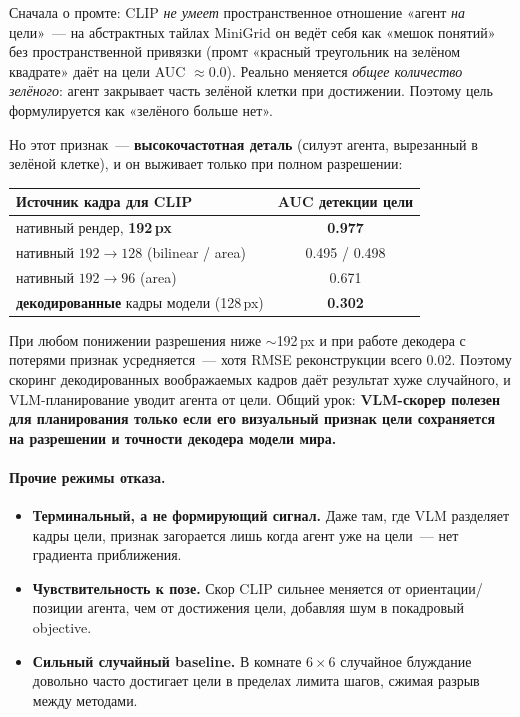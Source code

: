 \documentclass[11pt]{article}
\begin{document}
Сначала о промте: CLIP \emph{не умеет} пространственное отношение «агент \emph{на} цели»~---
на абстрактных тайлах MiniGrid он ведёт себя как «мешок понятий» без пространственной
привязки (промт «красный треугольник на зелёном квадрате» даёт на цели AUC $\approx 0.0$).
Реально меняется \emph{общее количество зелёного}: агент закрывает часть зелёной клетки при
достижении. Поэтому цель формулируется как «зелёного больше нет».

Но этот признак~--- \textbf{высокочастотная деталь} (силуэт агента, вырезанный в зелёной
клетке), и он выживает только при полном разрешении:

\begin{center}
\small
\begin{tabular}{@{}>{\raggedright\arraybackslash}p{9.5cm}c@{}}
\toprule
Источник кадра для CLIP & AUC детекции цели \\
\midrule
нативный рендер, \textbf{192\,px} & \textbf{0.977} \\
нативный $192 \to 128$ (bilinear / area) & 0.495 / 0.498 \\
нативный $192 \to 96$ (area) & 0.671 \\
\textbf{декодированные} кадры модели (128\,px) & \textbf{0.302} \\
\bottomrule
\end{tabular}
\end{center}

\noindent При любом понижении разрешения ниже $\sim$192\,px и при работе декодера с
потерями признак усредняется~--- хотя RMSE реконструкции всего 0.02. Поэтому скоринг
декодированных воображаемых кадров даёт результат хуже случайного, и VLM-планирование
уводит агента от цели. Общий урок: \textbf{VLM-скорер полезен для планирования только если
его визуальный признак цели сохраняется на разрешении и точности декодера модели мира.}

\paragraph{Прочие режимы отказа.}
\begin{itemize}
  \item \textbf{Терминальный, а не формирующий сигнал.} Даже там, где VLM разделяет кадры
  цели, признак загорается лишь когда агент уже на цели~--- нет градиента приближения.
  \item \textbf{Чувствительность к позе.} Скор CLIP сильнее меняется от ориентации/позиции
  агента, чем от достижения цели, добавляя шум в покадровый objective.
  \item \textbf{Сильный случайный baseline.} В комнате $6\times6$ случайное блуждание
  довольно часто достигает цели в пределах лимита шагов, сжимая разрыв между методами.
\end{itemize}
\end{document}
